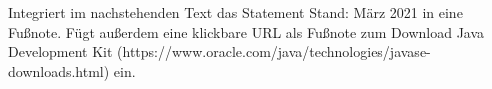 Integriert im nachstehenden Text das Statement \glqq{}Stand: März 2021\grqq{} in eine Fußnote. Fügt außerdem eine klickbare URL als Fußnote zum Download Java Development Kit (https://www.oracle.com/java/technologies/javase-downloads.html) ein.

